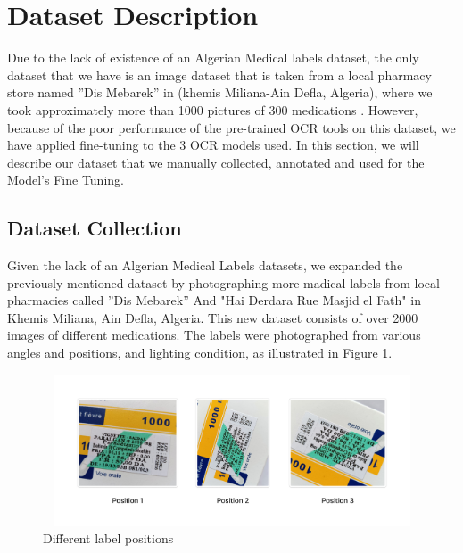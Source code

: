 
\section{Dataset Description}
Due to the lack of existence of an Algerian Medical labels dataset, the only dataset that we have is an image dataset that is taken from a local pharmacy store named ”Dis Mebarek” in (khemis Miliana-Ain Defla, Algeria), where we took approximately more than 1000 pictures of 300 medications \cite{meghatria2024}. However, because of the poor performance of the pre-trained OCR tools on this dataset, we have applied fine-tuning to the 3 OCR models used. %
In this section, we will describe our dataset that we manually collected, annotated and used for the Model's Fine Tuning. %

\subsection{Dataset Collection}
Given the lack of an Algerian Medical Labels datasets, we expanded the previously mentioned dataset by photographing more madical labels from local pharmacies called
 ”Dis Mebarek” And "Hai Derdara Rue Masjid el Fath" in Khemis Miliana, Ain Defla, Algeria.
This new dataset consists of over 2000 images of different medications. The labels were photographed from various angles and positions, and lighting condition, as illustrated in Figure \ref{fig:labelsposition}.%
\vspace{-0.5cm}
\begin{figure}[H]
    \centering
    \includegraphics[width=12cm, height=4.5cm]{Figures/Chapter 3/labels_position.png}
    \caption{Different label positions}
    \label{fig:labelsposition}
\end{figure}


